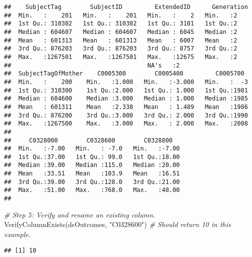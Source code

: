 \documentclass[smallextended]{svjour3}       %
\newenvironment{Shaded}{\begin{snugshade}}{\end{snugshade}}
\newcommand{\CommentTok}[1]{\textcolor[rgb]{0.56,0.35,0.01}{\textit{#1}}}
\newcommand{\FunctionTok}[1]{\textcolor[rgb]{0.00,0.00,0.00}{#1}}
\newcommand{\NormalTok}[1]{#1}
\newcommand{\StringTok}[1]{\textcolor[rgb]{0.31,0.60,0.02}{#1}}
\begin{document}
\begin{verbatim}
##    SubjectTag        SubjectID         ExtendedID      Generation
##  Min.   :    201   Min.   :    201   Min.   :    2   Min.   :2   
##  1st Qu.: 310302   1st Qu.: 310302   1st Qu.: 3101   1st Qu.:2   
##  Median : 604607   Median : 604607   Median : 6045   Median :2   
##  Mean   : 601313   Mean   : 601313   Mean   : 6007   Mean   :2   
##  3rd Qu.: 876203   3rd Qu.: 876203   3rd Qu.: 8757   3rd Qu.:2   
##  Max.   :1267501   Max.   :1267501   Max.   :12675   Max.   :2   
##                                      NA's   :2                   
##  SubjectTagOfMother    C0005300        C0005400         C0005700   
##  Min.   :    200    Min.   :1.000   Min.   :-3.000   Min.   :  -3  
##  1st Qu.: 310300    1st Qu.:2.000   1st Qu.: 1.000   1st Qu.:1981  
##  Median : 604600    Median :3.000   Median : 1.000   Median :1985  
##  Mean   : 601311    Mean   :2.338   Mean   : 1.489   Mean   :1986  
##  3rd Qu.: 876200    3rd Qu.:3.000   3rd Qu.: 2.000   3rd Qu.:1990  
##  Max.   :1267500    Max.   :3.000   Max.   : 2.000   Max.   :2008  
##                                                                    
##     C0328000        C0328600        C0328800    
##  Min.   :-7.00   Min.   : -7.0   Min.   :-7.00  
##  1st Qu.:37.00   1st Qu.: 99.0   1st Qu.:18.00  
##  Median :39.00   Median :115.0   Median :20.00  
##  Mean   :33.51   Mean   :103.9   Mean   :16.51  
##  3rd Qu.:39.00   3rd Qu.:128.0   3rd Qu.:21.00  
##  Max.   :51.00   Max.   :768.0   Max.   :48.00  
## 
\end{verbatim}

\begin{Shaded}
\begin{Highlighting}[]
\CommentTok{\# Step 5: Verify and rename an existing column.}
\FunctionTok{VerifyColumnExists}\NormalTok{(dsOutcomes, }\StringTok{"C0328600"}\NormalTok{) }\CommentTok{\# Should return \textquotesingle{}10\textquotesingle{} in this example.}
\end{Highlighting}
\end{Shaded}

\begin{verbatim}
## [1] 10
\end{verbatim}
\end{document}

